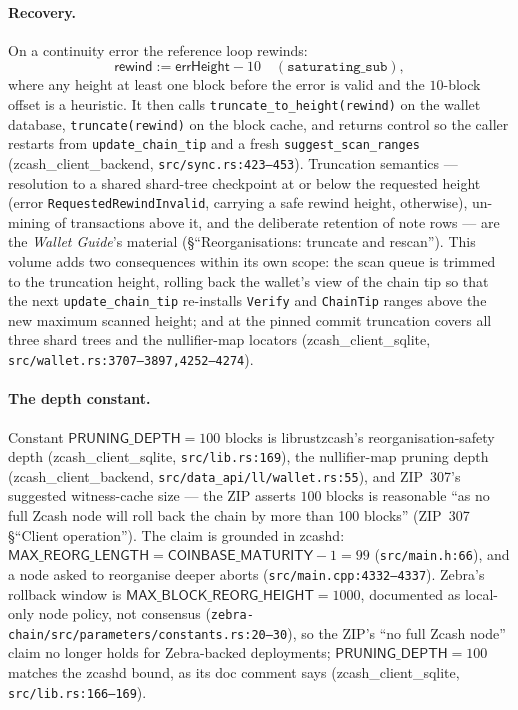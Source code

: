 \documentclass[11pt,a4paper]{article}
\theoremstyle{definition}
\begin{document}
\paragraph{Recovery.} On a continuity error the reference loop rewinds:
\[
\mathsf{rewind} := \mathsf{errHeight} - 10 \quad
(\texttt{saturating\_sub}),
\]
where any height at least one block before the error is valid and the
$10$-block offset is a heuristic. It then calls
\texttt{truncate\_to\_height(rewind)} on the wallet database,
\texttt{truncate(rewind)} on the block cache, and returns control so the
caller restarts from \texttt{update\_chain\_tip} and a fresh
\texttt{suggest\_scan\_ranges}
(\textsf{zcash\_client\_backend}, \texttt{src/sync.rs:423--453}).
Truncation semantics --- resolution to a shared shard-tree checkpoint at
or below the requested height (error \texttt{RequestedRewindInvalid},
carrying a safe rewind height, otherwise), un-mining of transactions
above it, and the deliberate retention of note rows --- are the
\emph{Wallet Guide}'s material (\S``Reorganisations: truncate and
rescan''). This volume adds two consequences within its own scope: the
scan queue is trimmed to the truncation height, rolling back the
wallet's view of the chain tip so that the next
\texttt{update\_chain\_tip} re-installs \texttt{Verify} and
\texttt{ChainTip} ranges above the new maximum scanned height; and at
the pinned commit truncation covers all three shard trees and the
nullifier-map locators
(\textsf{zcash\_client\_sqlite}, \texttt{src/wallet.rs:3707--3897,4252--4274}).

\paragraph{The depth constant.} Constant $\mathsf{PRUNING\_DEPTH} = 100$
blocks is \textsf{librustzcash}'s reorganisation-safety depth
(\textsf{zcash\_client\_sqlite}, \texttt{src/lib.rs:169}), the nullifier-map
pruning
depth (\textsf{zcash\_client\_backend}, \texttt{src/data\_api/ll/wallet.rs:55}),
and
ZIP~307's suggested witness-cache size --- the ZIP asserts $100$ blocks is
reasonable ``as no full Zcash node will roll back the chain by more than
100 blocks'' (ZIP~307 \S``Client operation''). The claim is grounded in
\textsf{zcashd}: $\mathsf{MAX\_REORG\_LENGTH} =
\mathsf{COINBASE\_MATURITY} - 1 = 99$ (\texttt{src/main.h:66}), and a
node asked to reorganise deeper aborts
(\texttt{src/main.cpp:4332--4337}). \textsf{Zebra}'s rollback window is
$\mathsf{MAX\_BLOCK\_REORG\_HEIGHT} = 1000$, documented as local-only
node policy, not consensus
(\texttt{zebra-chain/src/parameters/constants.rs:20--30}), so the ZIP's
``no full Zcash node'' claim no longer holds for Zebra-backed
deployments; $\mathsf{PRUNING\_DEPTH} = 100$ matches the zcashd bound,
as its doc comment says (\textsf{zcash\_client\_sqlite},
\texttt{src/lib.rs:166--169}).
\end{document}
